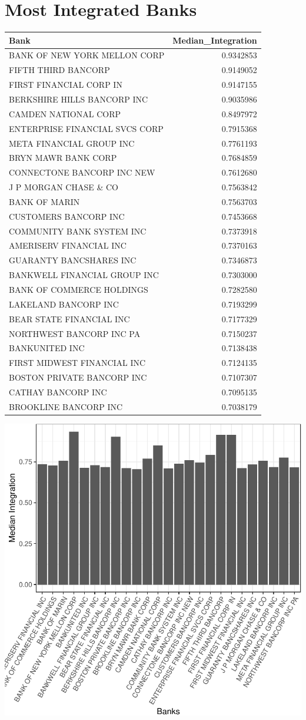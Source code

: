 \documentclass[11pt,]{article}
\begin{document}
\section{Most Integrated Banks}\label{most-integrated-banks}

\begin{longtable}[]{@{}lr@{}}
\toprule
Bank & Median\_Integration\tabularnewline
\midrule
\endhead
BANK OF NEW YORK MELLON CORP & 0.9342853\tabularnewline
FIFTH THIRD BANCORP & 0.9149052\tabularnewline
FIRST FINANCIAL CORP IN & 0.9147155\tabularnewline
BERKSHIRE HILLS BANCORP INC & 0.9035986\tabularnewline
CAMDEN NATIONAL CORP & 0.8497972\tabularnewline
ENTERPRISE FINANCIAL SVCS CORP & 0.7915368\tabularnewline
META FINANCIAL GROUP INC & 0.7761193\tabularnewline
BRYN MAWR BANK CORP & 0.7684859\tabularnewline
CONNECTONE BANCORP INC NEW & 0.7612680\tabularnewline
J P MORGAN CHASE \& CO & 0.7563842\tabularnewline
BANK OF MARIN & 0.7563703\tabularnewline
CUSTOMERS BANCORP INC & 0.7453668\tabularnewline
COMMUNITY BANK SYSTEM INC & 0.7373918\tabularnewline
AMERISERV FINANCIAL INC & 0.7370163\tabularnewline
GUARANTY BANCSHARES INC & 0.7346873\tabularnewline
BANKWELL FINANCIAL GROUP INC & 0.7303000\tabularnewline
BANK OF COMMERCE HOLDINGS & 0.7282580\tabularnewline
LAKELAND BANCORP INC & 0.7193299\tabularnewline
BEAR STATE FINANCIAL INC & 0.7177329\tabularnewline
NORTHWEST BANCORP INC PA & 0.7150237\tabularnewline
BANKUNITED INC & 0.7138438\tabularnewline
FIRST MIDWEST FINANCIAL INC & 0.7124135\tabularnewline
BOSTON PRIVATE BANCORP INC & 0.7107307\tabularnewline
CATHAY BANCORP INC & 0.7095135\tabularnewline
BROOKLINE BANCORP INC & 0.7038179\tabularnewline
\bottomrule
\end{longtable}

\begin{center}\includegraphics{AC_US_Bank_Int_Results_1_files/figure-latex/most_int-1} \end{center}
\end{document}
